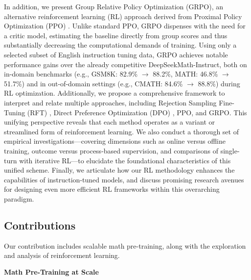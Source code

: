 In addition, we present Group Relative Policy Optimization (GRPO), an alternative reinforcement learning (RL) approach derived from Proximal Policy Optimization (PPO) \citep{schulman2017proximal}. Unlike standard PPO, GRPO dispenses with the need for a critic model, estimating the baseline directly from group scores and thus substantially decreasing the computational demands of training. Using only a selected subset of English instruction tuning data, GRPO achieves notable performance gains over the already competitive DeepSeekMath-Instruct, both on in-domain benchmarks (e.g., GSM8K: 82.9\% $\rightarrow$ 88.2\%, MATH: 46.8\% $\rightarrow$ 51.7\%) and in out-of-domain settings (e.g., CMATH: 84.6\% $\rightarrow$ 88.8\%) during RL optimization. Additionally, we propose a comprehensive framework to interpret and relate multiple approaches, including Rejection Sampling Fine-Tuning (RFT) \citep{yuan2023scaling}, Direct Preference Optimization (DPO) \citep{dpo}, PPO, and GRPO. This unifying perspective reveals that each method operates as a variant or streamlined form of reinforcement learning. We also conduct a thorough set of empirical investigations—covering dimensions such as online versus offline training, outcome versus process-based supervision, and comparisons of single-turn with iterative RL—to elucidate the foundational characteristics of this unified scheme. Finally, we articulate how our RL methodology enhances the capabilities of instruction-tuned models, and discuss promising research avenues for designing even more efficient RL frameworks within this overarching paradigm.

\subsection{Contributions}
Our contribution includes scalable math pre-training, along with the exploration and analysis of reinforcement learning.

\textbf{Math Pre-Training at Scale}


